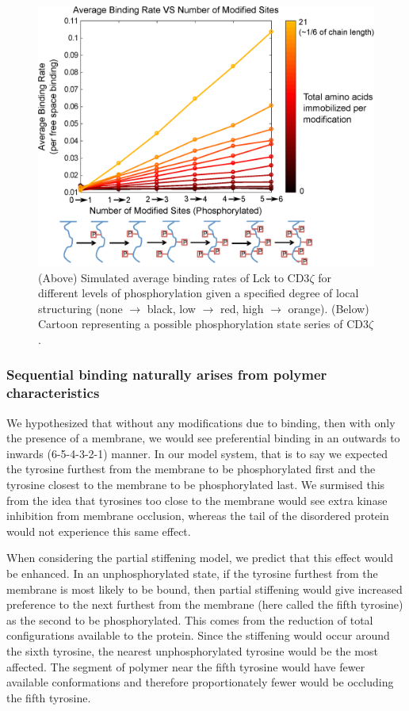 \documentclass[../../AdvancementSummary.tex]{subfiles}
\begin{document}

\begin{figure}[H]
	\begin{center}
		\includegraphics[width=0.8\linewidth]{ResultsFigures/CD3ZetaStiffeningMembraneOn/AvgBindVSTotalPhosColorMapLabeled.eps}
		\caption{(Above) Simulated average binding rates of Lck to CD3$\zeta$ for different levels of phosphorylation given a specified degree of local structuring (none $\rightarrow$ black, low $\rightarrow$ red, high $\rightarrow$ orange). (Below) Cartoon representing a possible phosphorylation state series of CD3$\zeta$. \label{fig: StiffeningMemOnCoop}}
	\end{center}
\end{figure}


\subsubsection{Sequential binding naturally arises from polymer characteristics}

We hypothesized that without any modifications due to binding, then with only the presence of a membrane, we would see preferential binding in an outwards to inwards (6-5-4-3-2-1) manner. In our model system, that is to say we expected the tyrosine furthest from the membrane to be phosphorylated first and the tyrosine closest to the membrane to be phosphorylated last. We surmised this from the idea that tyrosines too close to the membrane would see extra kinase inhibition from membrane occlusion, whereas the tail of the disordered protein would not experience this same effect. 

When considering the partial stiffening model, we predict that this effect would be enhanced. In an unphosphorylated state, if the tyrosine furthest from the membrane is most likely to be bound, then partial stiffening would give increased preference to the next furthest from the membrane (here called the fifth tyrosine) as the second to be phosphorylated. This comes from the reduction of total configurations available to the protein. Since the stiffening would occur around the sixth tyrosine, the nearest unphosphorylated tyrosine would be the most affected. The segment of polymer near the fifth tyrosine would have fewer available conformations and therefore proportionately fewer would be occluding the fifth tyrosine.
\end{document}
